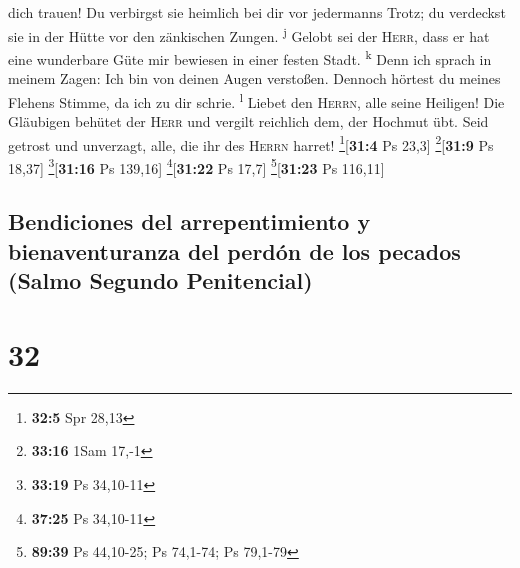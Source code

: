 dich trauen!  Du verbirgst sie heimlich bei dir vor
jedermanns Trotz; du verdeckst sie in der Hütte vor den zänkischen
Zungen. \textsuperscript{j}  Gelobt sei der
\textsc{Herr}, dass er hat eine wunderbare Güte mir bewiesen in einer
festen Stadt. \textsuperscript{k}  Denn ich sprach in
meinem Zagen: Ich bin von deinen Augen verstoßen. Dennoch hörtest du
meines Flehens Stimme, da ich zu dir schrie. \textsuperscript{l}
 Liebet den \textsc{Herrn}, alle seine Heiligen! Die
Gläubigen behütet der \textsc{Herr} und vergilt reichlich dem, der
Hochmut übt.  Seid getrost und unverzagt, alle, die ihr
des \textsc{Herrn} harret! \footnote{\textbf{32:5} Spr 28,13}{[}\textbf{31:4}
Ps 23,3{]} \footnote{\textbf{33:16} 1Sam 17,-1}{[}\textbf{31:9} Ps
18,37{]} \footnote{\textbf{33:19} Ps 34,10-11}{[}\textbf{31:16} Ps
139,16{]} \footnote{\textbf{37:25} Ps 34,10-11}{[}\textbf{31:22} Ps
17,7{]} \footnote{\textbf{89:39} Ps 44,10-25; Ps 74,1-74; Ps 79,1-79}{[}\textbf{31:23}
Ps 116,11{]}

\hypertarget{bendiciones-del-arrepentimiento-y-bienaventuranza-del-perduxf3n-de-los-pecados-salmo-segundo-penitencial}{%
\subsection{Bendiciones del arrepentimiento y bienaventuranza del perdón
de los pecados (Salmo Segundo
Penitencial)}\label{bendiciones-del-arrepentimiento-y-bienaventuranza-del-perduxf3n-de-los-pecados-salmo-segundo-penitencial}}

\hypertarget{section-31}{%
\section{32}\label{section-31}}

